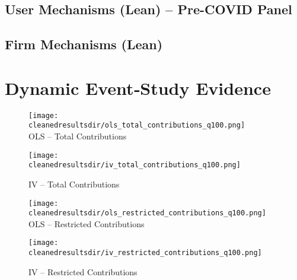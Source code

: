 \documentclass{article}
\newcommand{\cleanedresultsdir}{../results/cleaned}
\begin{document}
\begin{landscape}
\subsection{User Mechanisms (Lean) -- Pre-COVID Panel}

\end{landscape}

\clearpage
\begin{landscape}
\subsection{Firm Mechanisms (Lean)}

\end{landscape}

\clearpage
\section{Dynamic Event‐Study Evidence}


\begin{figure}[H]
  \centering
  \texttt{[image: \\cleanedresultsdir/ols\_total\_contributions\_q100.png]}\\[2pt]
  \caption*{OLS – Total Contributions}
  \texttt{[image: \\cleanedresultsdir/iv\_total\_contributions\_q100.png]}\\[2pt]
  \caption*{IV – Total Contributions}
\end{figure}

\clearpage

\begin{figure}[H]
  \centering
  \texttt{[image: \\cleanedresultsdir/ols\_restricted\_contributions\_q100.png]}\\[2pt]
  \caption*{OLS – Restricted Contributions}
  \texttt{[image: \\cleanedresultsdir/iv\_restricted\_contributions\_q100.png]}\\[2pt]
  \caption*{IV – Restricted Contributions}
\end{figure}
\end{document}
